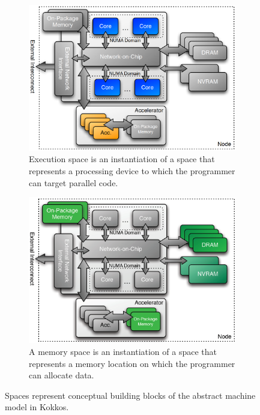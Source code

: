 \begin{figure}
\begin{subfigure}[b]{0.41\textwidth}
\centering
\includegraphics[width=\textwidth]{img/ExecSpaces.png}
\caption{Execution space is an instantiation of a space that represents a processing device to which the programmer can target parallel code.}
\label{fig:execspace}
\end{subfigure}
\hfill \break
\begin{subfigure}[b]{0.41\textwidth}
\centering
\includegraphics[width=\textwidth]{img/MemSpaces.png}
\caption{A memory space is an instantiation of a space that represents a memory location on which the programmer can allocate data.}
\label{fig:memspace}
\end{subfigure}
\caption{Spaces represent conceptual building blocks of the abstract machine model in Kokkos.}
\label{fig:spaces}
\end{figure}

